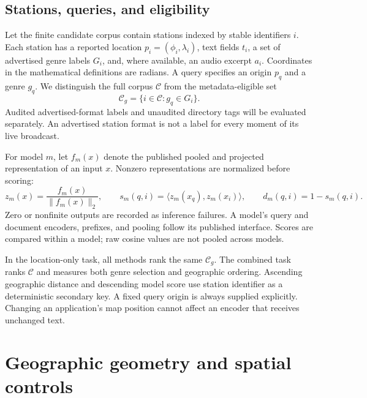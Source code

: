 \documentclass[10pt]{article}
\begin{document}
\subsection{Stations, queries, and eligibility}
Let the finite candidate corpus contain stations indexed by stable identifiers $i$. Each station has a reported location $p_i=(\phi_i,\lambda_i)$, text fields $t_i$, a set of advertised genre labels $G_i$, and, where available, an audio excerpt $a_i$. Coordinates in the mathematical definitions are radians. A query specifies an origin $p_q$ and a genre $g_q$. We distinguish the full corpus $\mathcal C$ from the metadata-eligible set
\begin{equation}
\mathcal C_g=\{i\in\mathcal C:g_q\in G_i\}.
\label{eq:eligible}
\end{equation}
Audited advertised-format labels and unaudited directory tags will be evaluated separately. An advertised station format is not a label for every moment of its live broadcast.

For model $m$, let $f_m(x)$ denote the published pooled and projected representation of an input $x$. Nonzero representations are normalized before scoring:
\begin{equation}
z_m(x)=\frac{f_m(x)}{\lVert f_m(x)\rVert_2},\qquad
s_m(q,i)=\langle z_m(x_q),z_m(x_i)\rangle,\qquad
d_m(q,i)=1-s_m(q,i).
\label{eq:semantic}
\end{equation}
Zero or nonfinite outputs are recorded as inference failures. A model's query and document encoders, prefixes, and pooling follow its published interface. Scores are compared within a model; raw cosine values are not pooled across models.

In the location-only task, all methods rank the same $\mathcal C_g$. The combined task ranks $\mathcal C$ and measures both genre selection and geographic ordering. Ascending geographic distance and descending model score use station identifier as a deterministic secondary key. A fixed query origin is always supplied explicitly. Changing an application's map position cannot affect an encoder that receives unchanged text.

\section{Geographic geometry and spatial controls}
\end{document}
